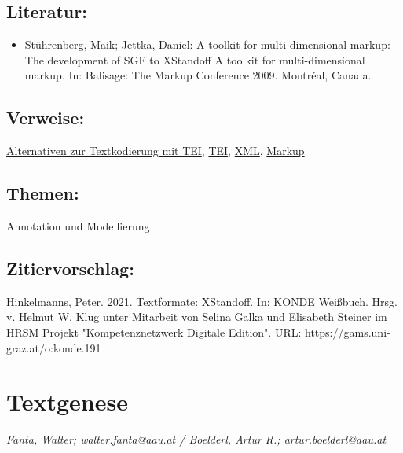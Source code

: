 \documentclass{article}
\begin{document}
        \subsection*{Literatur:}\begin{itemize}\item Stührenberg, Maik; Jettka, Daniel: A toolkit for multi-dimensional markup: The development of SGF to XStandoff A toolkit for multi-dimensional markup. In: Balisage: The Markup Conference 2009. Montréal, Canada.\end{itemize}\subsection*{Verweise:}\href{https://gams.uni-graz.at/o:konde.15}{Alternativen zur Textkodierung mit TEI}, \href{https://gams.uni-graz.at/o:konde.178}{TEI}, \href{https://gams.uni-graz.at/o:konde.215}{XML}, \href{https://gams.uni-graz.at/o:konde.126}{Markup}\subsection*{Themen:}Annotation und Modellierung\subsection*{Zitiervorschlag:}Hinkelmanns, Peter. 2021. Textformate: XStandoff. In: KONDE Weißbuch. Hrsg. v. Helmut W. Klug unter Mitarbeit von Selina Galka und Elisabeth Steiner im HRSM Projekt "Kompetenznetzwerk Digitale Edition". URL: https://gams.uni-graz.at/o:konde.191\newpage\section*{Textgenese} \emph{Fanta, Walter; walter.fanta@aau.at / Boelderl, Artur R.;
                  artur.boelderl@aau.at}\\
        
\end{document}
